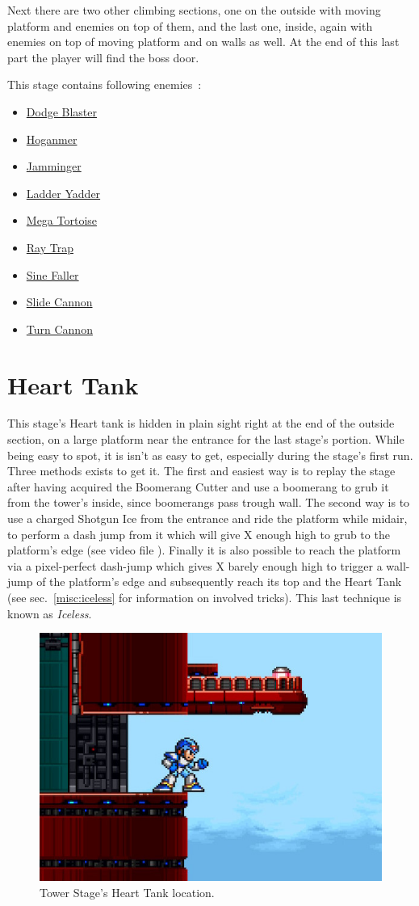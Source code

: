 Next there are two other climbing sections, one on the outside with moving platform and enemies on top of them, and the last one, inside, again with enemies on top of moving platform and on walls as well. At the end of this last part the player will find the boss door.


This stage contains following enemies~\cite{wiki:Tower}:

\begin{itemize}
	\item \hyperlink{enem:Dodge_Blaster}{Dodge Blaster}
	\item \hyperlink{enem:Hoganmer}{Hoganmer}
	\item \hyperlink{enem:Jamminger}{Jamminger}
	\item \hyperlink{enem:Ladder_Yadder}{Ladder Yadder}
	\item \hyperlink{enem:Mega_Tortoise}{Mega Tortoise}
	\item \hyperlink {enem:Ray_Trap}{Ray Trap}
	\item \hyperlink{enem:Sine_Faller}{Sine Faller}
	\item \hyperlink{enem:Slide_Cannon}{Slide Cannon}
	\item \hyperlink{enem:Turn_Cannon}{Turn Cannon}
\end{itemize}

\section{Heart Tank}
This stage's Heart tank is hidden in plain sight right at the end of the outside section, on a large platform near the entrance for the last stage's portion. While being easy to spot, it is isn't as easy to get, especially during the stage's first run. Three methods exists to get it. The first and easiest way is to replay the stage after having acquired the Boomerang Cutter and use a boomerang to grub it from the tower's inside, since boomerangs pass trough wall. The second way is to use a charged Shotgun Ice from the entrance and ride the platform while midair, to perform a dash jump from it which will give X enough high to grub to the platform's edge (see video file ). Finally it is also possible to reach the platform via a pixel-perfect dash-jump which gives X barely enough high to trigger a wall-jump of the platform's edge and subsequently reach its top and the Heart Tank (see sec.~\ref{misc:iceless} for information on involved tricks). This last technique is known as \textit{Iceless}. 
\begin{figure}[htp]
	\centering
	\includegraphics[width=0.4\linewidth]{figures/X1/Boomer_kuwanger/Tower_heart.jpg}
	\caption{Tower Stage's Heart Tank location.}
\end{figure}

